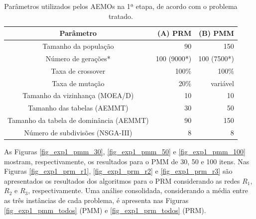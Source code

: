 \begin{table}[!htbp]
	\caption{Parâmetros utilizados pelos AEMOs na 1ª etapa, de acordo com o problema tratado.}
	\label{table_exp1_parametros}
	\begin{center}
		\begin{tabular}{c|r|r}
			\textbf{Parâmetro} & \textbf{(A) PRM} &  \textbf{(B) PMM} \\ %
			\hline
			Tamanho da população                    &    90 &      150 \\ %
			Número de gerações*                     &   100 (9000*) &      100 (7500*) \\ %
			Taxa de crossover                       & 100\% &    100\% \\ %
			Taxa de mutação                         &  20\% & variável \\ %
			Tamanho da vizinhança (MOEA/D)          &    10 &       10 \\ %
			Tamanho das tabelas (AEMMT)             &    30 &       50 \\ %
			Tamanho da tabela de dominância (AEMMT) &    90 &      150 \\ %
			Número de subdivisões (NSGA-III)        &     8 &        8 \\
			\hline
		\end{tabular}
	\end{center}
\end{table}

As Figuras \ref{fig_exp1_pmm_30}, \ref{fig_exp1_pmm_50} e \ref{fig_exp1_pmm_100} mostram, respectivamente, os resultados para o PMM de 30, 50 e 100 itens. Nas Figuras \ref{fig_exp1_prm_r1}, \ref{fig_exp1_prm_r2} e \ref{fig_exp1_prm_r3} são apresentados os resultados dos algoritmos para o PRM considerando as redes $R_1$, $R_2$ e $R_3$, respectivamente. Uma análise consolidada, considerando a média entre as três instâncias de cada problema, é apresenta nas Figuras \ref{fig_exp1_pmm_todos} (PMM) e \ref{fig_exp1_prm_todos} (PRM).

